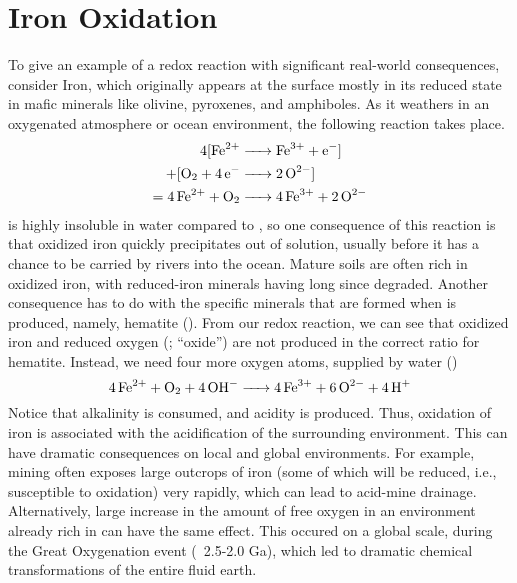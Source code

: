 \section{Iron Oxidation}
To give an example of a redox reaction with significant real-world consequences, consider Iron, which originally appears at the surface mostly in its reduced  state in mafic minerals like olivine, pyroxenes, and amphiboles. As it weathers in an oxygenated atmosphere or ocean environment, the following reaction takes place.
\begin{align*}
    4[\ce{Fe^2+ &-> Fe^3+ + e-}]\\ + [\ce{O2 + 4e- &-> 2O^2-}]\\ = \ce{4Fe^2+ + O2 &-> 4Fe^3+ + 2O^2-}
\end{align*}
 is highly insoluble in water compared to , so one consequence of this reaction is that oxidized iron quickly precipitates out of solution, usually before it has a chance to be carried by rivers into the ocean. Mature soils are often rich in oxidized iron, with reduced-iron minerals having long since degraded. Another consequence has to do with the specific minerals that are formed when  is produced, namely, hematite (). From our redox reaction, we can see that oxidized iron and reduced oxygen (; ``oxide'') are not produced in the correct ratio for hematite. Instead, we need four more oxygen atoms, supplied by water ()
\[\ce{4Fe^2+ + O2 + 4OH- -> 4Fe^3+ + 6O^2- + 4H+}\]
Notice that alkalinity  is consumed, and acidity  is produced. Thus, oxidation of iron is associated with the acidification of the surrounding environment. This can have dramatic consequences on local and global environments. For example, mining often exposes large outcrops of iron (some of which will be reduced, i.e., susceptible to oxidation) very rapidly, which can lead to acid-mine drainage. Alternatively, large increase in the amount of free oxygen in an environment already rich in  can have the same effect. This occured on a global scale, during the Great Oxygenation event (~2.5-2.0 Ga), which led to dramatic chemical transformations of the entire fluid earth.